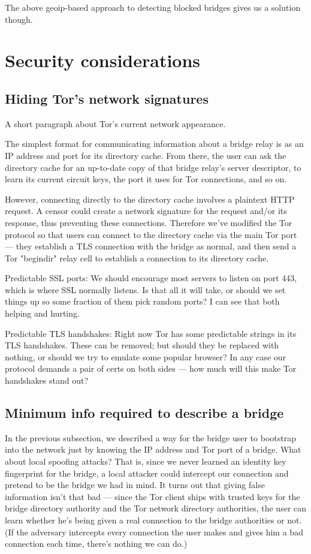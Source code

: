 \documentclass{llncs}
\begin{document}
The above geoip-based approach to detecting blocked bridges gives us a
solution though.


\section{Security considerations}
\label{sec:security}

\subsection{Hiding Tor's network signatures}
\label{subsec:enclave-dirs}

A short paragraph about Tor's current network appearance.

The simplest format for communicating information about a bridge relay
is as an IP address and port for its directory cache. From there, the
user can ask the directory cache for an up-to-date copy of that bridge
relay's server descriptor, to learn its current circuit keys, the port
it uses for Tor connections, and so on.

However, connecting directly to the directory cache involves a plaintext
HTTP request. A censor could create a network signature for the
request and/or its response, thus preventing these connections. Therefore
we've modified the Tor protocol so that users can connect to the directory
cache via the main Tor port --- they establish a TLS connection with
the bridge as normal, and then send a Tor "begindir" relay cell to
establish a connection to its directory cache.

Predictable SSL ports:
We should encourage most servers to listen on port 443, which is
where SSL normally listens.
Is that all it will take, or should we set things up so some fraction
of them pick random ports? I can see that both helping and hurting.

Predictable TLS handshakes:
Right now Tor has some predictable strings in its TLS handshakes.
These can be removed; but should they be replaced with nothing, or
should we try to emulate some popular browser? In any case our
protocol demands a pair of certs on both sides --- how much will this
make Tor handshakes stand out?

\subsection{Minimum info required to describe a bridge}

In the previous subsection, we described a way for the bridge user
to bootstrap into the network just by knowing the IP address and
Tor port of a bridge. What about local spoofing attacks? That is,
since we never learned an identity key fingerprint for the bridge,
a local attacker could intercept our connection and pretend to be
the bridge we had in mind. It turns out that giving false information
isn't that bad --- since the Tor client ships with trusted keys for the
bridge directory authority and the Tor network directory authorities,
the user can learn whether he's being given a real connection to the
bridge authorities or not. (If the adversary intercepts every connection
the user makes and gives him a bad connection each time, there's nothing
we can do.)
\end{document}

